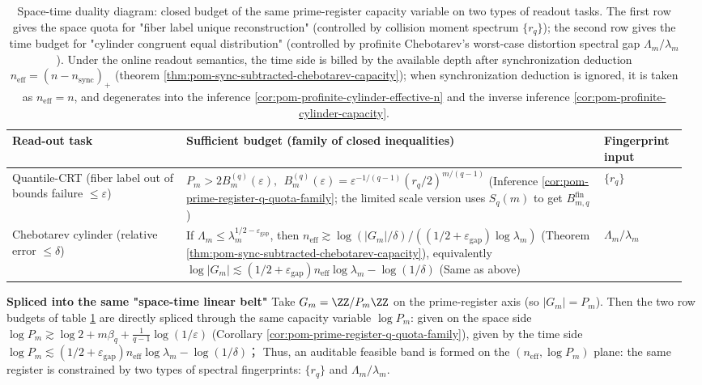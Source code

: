 \begin{table}[H]
\centering
\scriptsize
\setlength{\tabcolsep}{6pt}
\caption{Space-time duality diagram: closed budget of the same prime-register capacity variable on two types of readout tasks. The first row gives the space quota for "fiber label unique reconstruction" (controlled by collision moment spectrum \(\{r_q\}\)); the second row gives the time budget for "cylinder congruent equal distribution" (controlled by profinite Chebotarev's worst-case distortion spectral gap \(\Lambda_m/\lambda_m\)). Under the online readout semantics, the time side is billed by the available depth after synchronization deduction \(n_{\mathrm{eff}}=(n-n_{\mathrm{sync}})_+\) (theorem \ref{thm:pom-sync-subtracted-chebotarev-capacity}); when synchronization deduction is ignored, it is taken as \(n_{\mathrm{eff}}=n\), and degenerates into the inference \ref{cor:pom-profinite-cylinder-effective-n} and the inverse inference \ref{cor:pom-profinite-cylinder-capacity}. }
\label{tab:pom-space-time-duality-prime-register}
\begin{tabular}{p{0.25\linewidth} p{0.60\linewidth} p{0.12\linewidth}}
\toprule
Read-out task & Sufficient budget (family of closed inequalities) & Fingerprint input\\
\midrule
Quantile-CRT (fiber label out of bounds failure \(\le\varepsilon\)) &
\(
P_m>2B_m^{(q)}(\varepsilon),
\ \ 
B_m^{(q)}(\varepsilon)=\varepsilon^{-1/(q-1)}(r_q/2)^{m/(q-1)}
\)
(Inference \ref{cor:pom-prime-register-q-quota-family}; the limited scale version uses \(S_q(m)\) to get \(B_{m,q}^{\mathrm{fin}}\)) &
\(\{r_q\}\)\\

Chebotarev cylinder (relative error \(\le\delta\)) &
If \(\Lambda_m\le \lambda_m^{1/2-\varepsilon_{\mathrm{gap}}}\), then
\(
n_{\mathrm{eff}}\gtrsim \log(|G_m|/\delta)/((1/2+\varepsilon_{\mathrm{gap}})\log\lambda_m)
\)
(Theorem \ref{thm:pom-sync-subtracted-chebotarev-capacity}), equivalently
\(
\log|G_m|\lesssim (1/2+\varepsilon_{\mathrm{gap}})n_{\mathrm{eff}}\log\lambda_m-\log(1/\delta)
\)
(Same as above) &
\(\Lambda_m/\lambda_m\)\\
\bottomrule
\end{tabular}
\end{table}

\noindent\textbf{Spliced ​​into the same "space-time linear belt"}
Take \(G_m=\ZZ/P_m\ZZ\) on the prime-register axis (so \(|G_m|=P_m\)).
Then the two row budgets of table \ref{tab:pom-space-time-duality-prime-register} are directly spliced ​​through the same capacity variable \(\log P_m\): given on the space side
\(
\log P_m\gtrsim \log 2+m\beta_q+\frac{1}{q-1}\log(1/\varepsilon)
\)
(Corollary \ref{cor:pom-prime-register-q-quota-family}), given by the time side
\(
\log P_m\lesssim (1/2+\varepsilon_{\mathrm{gap}})n_{\mathrm{eff}}\log\lambda_m-\log(1/\delta)
\)；
Thus, an auditable feasible band is formed on the \((n_{\mathrm{eff}},\log P_m)\) plane: the same register is constrained by two types of spectral fingerprints: \(\{r_q\}\) and \(\Lambda_m/\lambda_m\).

